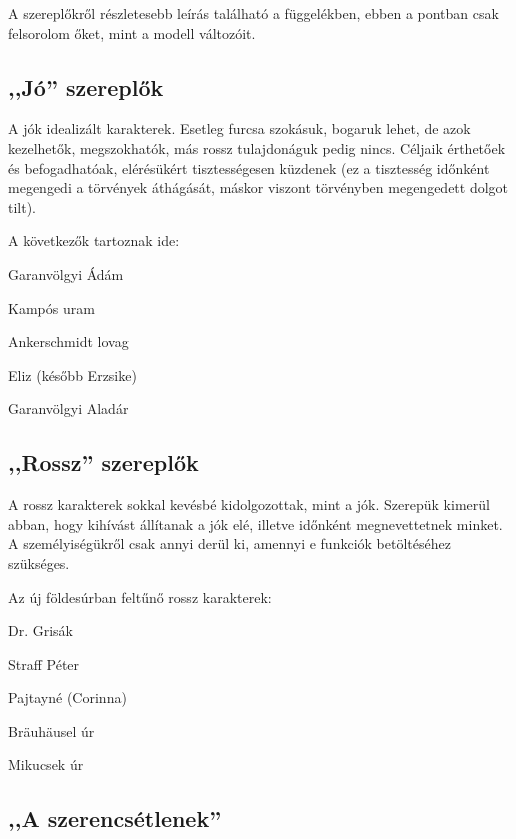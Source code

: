 \documentclass{thesis-ekf}
\begin{document}
    A szereplőkről részletesebb leírás található a függelékben, ebben a pontban csak felsorolom őket, mint a modell változóit.

    \subsection{,,Jó'' szereplők}

    A jók idealizált karakterek.
    Esetleg furcsa szokásuk, bogaruk lehet, de azok kezelhetők, megszokhatók, más rossz tulajdonáguk pedig nincs.
    Céljaik érthetőek és befogadhatóak, elérésükért tisztességesen küzdenek
        (ez a tisztesség időnként megengedi a törvények áthágását, máskor viszont törvényben megengedett dolgot tilt).

    A következők tartoznak ide:

    \begin{compactitem}
        \item Garanvölgyi Ádám
        \item Kampós uram
        \item Ankerschmidt lovag
        \item Eliz (később Erzsike)
        \item Garanvölgyi Aladár
    \end{compactitem}

    \subsection{,,Rossz'' szereplők}

    A rossz karakterek sokkal kevésbé kidolgozottak, mint a jók.
    Szerepük kimerül abban, hogy kihívást állítanak a jók elé, illetve időnként megnevettetnek minket.
    A személyiségükről csak annyi derül ki, amennyi e funkciók betöltéséhez szükséges.

    Az új földesúrban feltűnő rossz karakterek:

    \begin{compactitem}
        \item Dr. Grisák
        \item Straff Péter
        \item Pajtayné (Corinna)
        \item Bräuhäusel úr
        \item Mikucsek úr
    \end{compactitem}

    \subsection{,,A szerencsétlenek''}
\end{document}
